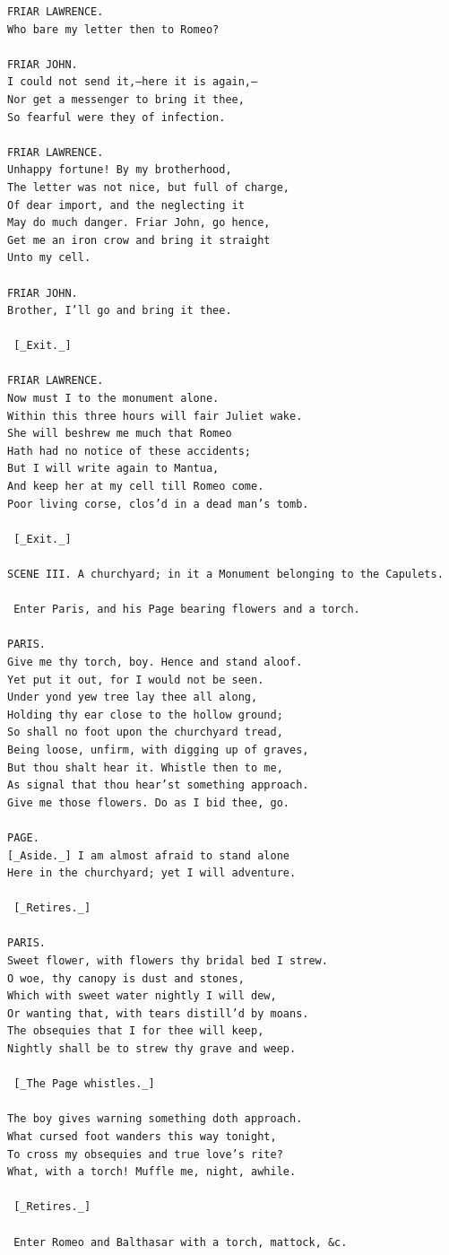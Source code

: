 \documentclass{article}
\begin{document}
\begin{verbatim}
FRIAR LAWRENCE.
Who bare my letter then to Romeo?

FRIAR JOHN.
I could not send it,—here it is again,—
Nor get a messenger to bring it thee,
So fearful were they of infection.

FRIAR LAWRENCE.
Unhappy fortune! By my brotherhood,
The letter was not nice, but full of charge,
Of dear import, and the neglecting it
May do much danger. Friar John, go hence,
Get me an iron crow and bring it straight
Unto my cell.

FRIAR JOHN.
Brother, I’ll go and bring it thee.

 [_Exit._]

FRIAR LAWRENCE.
Now must I to the monument alone.
Within this three hours will fair Juliet wake.
She will beshrew me much that Romeo
Hath had no notice of these accidents;
But I will write again to Mantua,
And keep her at my cell till Romeo come.
Poor living corse, clos’d in a dead man’s tomb.

 [_Exit._]

SCENE III. A churchyard; in it a Monument belonging to the Capulets.

 Enter Paris, and his Page bearing flowers and a torch.

PARIS.
Give me thy torch, boy. Hence and stand aloof.
Yet put it out, for I would not be seen.
Under yond yew tree lay thee all along,
Holding thy ear close to the hollow ground;
So shall no foot upon the churchyard tread,
Being loose, unfirm, with digging up of graves,
But thou shalt hear it. Whistle then to me,
As signal that thou hear’st something approach.
Give me those flowers. Do as I bid thee, go.

PAGE.
[_Aside._] I am almost afraid to stand alone
Here in the churchyard; yet I will adventure.

 [_Retires._]

PARIS.
Sweet flower, with flowers thy bridal bed I strew.
O woe, thy canopy is dust and stones,
Which with sweet water nightly I will dew,
Or wanting that, with tears distill’d by moans.
The obsequies that I for thee will keep,
Nightly shall be to strew thy grave and weep.

 [_The Page whistles._]

The boy gives warning something doth approach.
What cursed foot wanders this way tonight,
To cross my obsequies and true love’s rite?
What, with a torch! Muffle me, night, awhile.

 [_Retires._]

 Enter Romeo and Balthasar with a torch, mattock, &c.


\end{verbatim}
\end{document}
